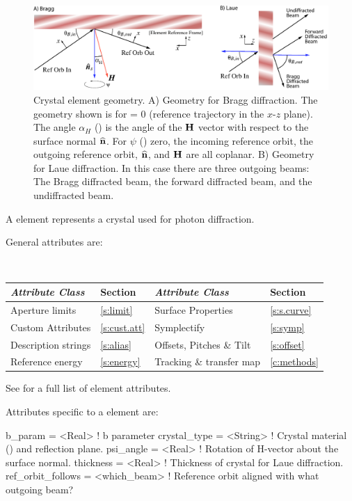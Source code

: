 \begin{figure}[tb]
  \centering
  \includegraphics[width=5in]{crystal-ele.pdf}
  \caption[Crystal element geometry.]
{Crystal element geometry.  A) Geometry for Bragg diffraction. The
geometry shown is for  = 0 (reference trajectory in the
$x$-$z$ plane). The angle $\alpha_H$ () is the angle
of the ${\bf H}$ vector with respect to the surface normal ${\widehat{\bf n}}$. For $\psi$ () zero, the incoming reference orbit,
the outgoing reference orbit, ${\widehat{\bf n}}$, and ${\bf H}$ are all
coplanar. B) Geometry for Laue diffraction. In this case there are
three outgoing beams: The Bragg diffracted beam, the forward
diffracted beam, and the undiffracted beam.}
  \label{f:crystal}
\end{figure}

A  element represents a crystal used for photon diffraction.

General  attributes are:
\begin{center}
\tt
\begin{tabular}{llll} \toprule
  {\sl Attribute Class}      & Section          & {\sl Attribute Class}      & Section         \\ \midrule
  Aperture limits            & \ref{s:limit}    & Surface Properties         & \ref{s:s.curve} \\ 
  Custom Attributes          & \ref{s:cust.att} & Symplectify                & \ref{s:symp}    \\
  Description strings        & \ref{s:alias}    & Offsets, Pitches \& Tilt   & \ref{s:offset}  \\
  Reference energy           & \ref{s:energy}   & Tracking \& transfer map   & \ref{c:methods} \\
  \bottomrule
\end{tabular}
\end{center}
\toffset
See  for a full list of element attributes.

Attributes specific to a  element are:
\begin{example}
  b_param            = <Real>       ! b parameter
  crystal_type       = <String>     ! Crystal material () and reflection plane.
  psi_angle          = <Real>       ! Rotation of H-vector about the surface normal.
  thickness          = <Real>       ! Thickness of crystal for Laue diffraction.
  ref_orbit_follows  = <which_beam> ! Reference orbit aligned with what outgoing beam?
\end{example}

